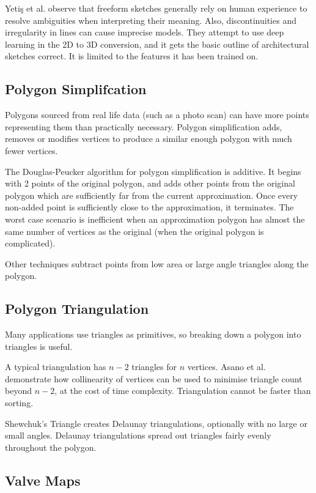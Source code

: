 \documentclass[conference]{IEEEtran}
\begin{document}
Yetiş et al. \cite{yetics2019auto} observe that freeform sketches generally rely on human experience to resolve ambiguities when interpreting their meaning. Also, discontinuities and irregularity in lines can cause imprecise models. They attempt to use deep learning in the 2D to 3D conversion, and it gets the basic outline of architectural sketches correct. It is limited to the features it has been trained on.

\subsection{Polygon Simplifcation}

Polygons sourced from real life data (such as a photo scan) can have more points representing them than practically necessary. Polygon simplification adds, removes or modifies vertices to produce a similar enough polygon with much fewer vertices.

The Douglas-Peucker algorithm \cite{douglas1973algorithms} for polygon simplification is additive. It begins with 2 points of the original polygon, and adds other points from the original polygon which are sufficiently far from the current approximation. Once every non-added point is sufficiently close to the approximation, it terminates. The worst case scenario is inefficient when an approximation polygon has almost the same number of vertices as the original (when the original polygon is complicated).

Other techniques subtract points from low area or large angle triangles along the polygon.

\subsection{Polygon Triangulation}

Many applications use triangles as primitives, so breaking down a polygon into triangles is useful.

A typical triangulation has $n-2$ triangles for $n$ vertices. Asano et al. \cite{asano1986polygon} demonstrate how collinearity of vertices can be used to minimise triangle count beyond $n-2$, at the cost of time complexity. Triangulation cannot be faster than sorting. 

Shewchuk's Triangle \cite{shewchuk2005two} creates Delaunay triangulations, optionally with no large or small angles. Delaunay triangulations spread out triangles fairly evenly throughout the polygon.

\subsection{Valve Maps}
\end{document}
